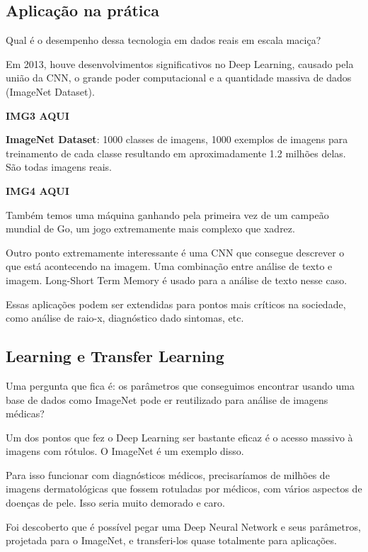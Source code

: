 \documentclass[11pt, a4paper]{article}
\begin{document}
\subsection{Aplicação na prática}

Qual é o desempenho dessa tecnologia em dados reais em escala maciça?

Em 2013, houve desenvolvimentos significativos no Deep Learning, causado pela união da CNN, o grande poder computacional e a quantidade massiva de dados (ImageNet Dataset).

\textbf{IMG3 AQUI}

\textbf{ImageNet Dataset}: 1000 classes de imagens, 1000 exemplos de imagens para treinamento de cada classe resultando em aproximadamente 1.2 milhões delas. São todas imagens reais.


\textbf{IMG4 AQUI}

Também temos uma máquina ganhando pela primeira vez de um campeão mundial de Go, um jogo extremamente mais complexo que xadrez.

Outro ponto extremamente interessante é uma CNN que consegue descrever o que está acontecendo na imagem. Uma combinação entre análise de texto e imagem. Long-Short Term Memory é usado para a análise de texto nesse caso.

Essas aplicações podem ser extendidas para pontos mais críticos na sociedade, como análise de raio-x, diagnóstico dado sintomas, etc.

\subsection{Learning e Transfer Learning}

Uma pergunta que fica é: os parâmetros que conseguimos encontrar usando uma base de dados como ImageNet pode er reutilizado para análise de imagens médicas?

Um dos pontos que fez o Deep Learning ser bastante eficaz é o acesso massivo à imagens com rótulos. O ImageNet é um exemplo disso.

Para isso funcionar com diagnósticos médicos, precisaríamos de milhões de imagens dermatológicas que fossem rotuladas por médicos, com vários aspectos de doenças de pele. Isso seria muito demorado e caro.

Foi descoberto que é possível pegar uma Deep Neural Network e seus parâmetros, projetada para o ImageNet, e transferi-los quase totalmente para aplicações.
\end{document}
